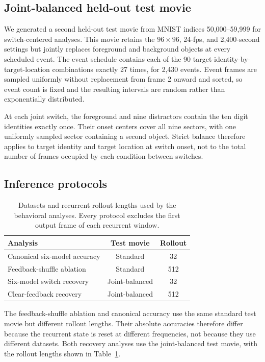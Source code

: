 \subsection{Joint-balanced held-out test movie}

We generated a second held-out test movie from MNIST indices 50,000--59,999 for switch-centered analyses. This movie retains the \(96\times96\), 24-fps, and 2,400-second settings but jointly replaces foreground and background objects at every scheduled event. The event schedule contains each of the 90 target-identity-by-target-location combinations exactly 27 times, for 2,430 events. Event frames are sampled uniformly without replacement from frame 2 onward and sorted, so event count is fixed and the resulting intervals are random rather than exponentially distributed.

At each joint switch, the foreground and nine distractors contain the ten digit identities exactly once. Their onset centers cover all nine sectors, with one uniformly sampled sector containing a second object. Strict balance therefore applies to target identity and target location at switch onset, not to the total number of frames occupied by each condition between switches.

\subsection{Inference protocols}

\begin{table}[t]
\centering
\caption{Datasets and recurrent rollout lengths used by the behavioral analyses. Every protocol excludes the first output frame of each recurrent window.}
\label{tab:inference-protocols}
\begin{tabular}{lcc}
\toprule
Analysis & Test movie & Rollout \\
\midrule
Canonical six-model accuracy & Standard & 32 \\
Feedback-shuffle ablation & Standard & 512 \\
Six-model switch recovery & Joint-balanced & 32 \\
Clear-feedback recovery & Joint-balanced & 512 \\
\bottomrule
\end{tabular}
\end{table}

The feedback-shuffle ablation and canonical accuracy use the same standard test movie but different rollout lengths. Their absolute accuracies therefore differ because the recurrent state is reset at different frequencies, not because they use different datasets. Both recovery analyses use the joint-balanced test movie, with the rollout lengths shown in Table~\ref{tab:inference-protocols}.

